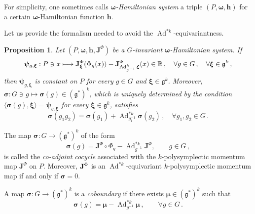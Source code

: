 \documentclass[11pt]{article}
\theoremstyle{plain}
\newtheorem{proposition}[theorem]{Proposition}
\theoremstyle{definition}
\newcommand{\bomega}{{\boldsymbol{\omega}}}
\newcommand{\bh}{{\boldsymbol{h}}}
\DeclareMathOperator{\Ad}{Ad}
\numberwithin{equation}{section}
\begin{document}
For simplicity, one sometimes calls {\it $\bomega$-Hamiltonian system} a triple $(P,\bomega,\bh)$ for a certain $\bomega$-Hamiltonian function $\bh$. 

Let us provide the formalism needed to avoid the $\Ad^{*k}$-equivariantness.

\begin{proposition}
\label{Prop::PsiConstant}
Let $(P,\boldsymbol\omega,\bm h,\mathbf{J}^\Phi)$ be a $G$-invariant $\bomega$-Hamiltonian system. If
\[
    \boldsymbol\psi _{g,\boldsymbol{\xi}}:P\ni x\longmapsto  {\bf J}^\Phi_{\boldsymbol{\xi}}(\Phi_g(x))-{\bf J}^\Phi_{\Ad_{g^{-1}}^k\boldsymbol{\xi}}(x)\in\mathbb{R}\,,\quad\forall g\in G\,,\quad\forall \boldsymbol{\xi}\in\mathfrak{g}^k\,,
\]
then $\boldsymbol\psi_{g,\boldsymbol{\xi}}$ is constant on $P$ for every $g\in G$ and $\boldsymbol{\xi}\in\mathfrak{g}^k$. Moreover, $\boldsymbol\sigma:G\ni g\mapsto {\boldsymbol \sigma}(g)\in (\mathfrak{g}^*)^k$, which is uniquely determined by the condition $\langle \boldsymbol\sigma(g),\boldsymbol{\xi}\rangle =\boldsymbol\psi_{g,\boldsymbol{\xi}}$ for every $
{\bm \xi}\in \mathfrak{g}^k$, satisfies
\[    \boldsymbol\sigma(g_1g_2)=\boldsymbol\sigma(g_1)+\Ad^{*k}_{g_1^{-1}}\boldsymbol\sigma(g_2)\,,\quad\forall g_1,g_2\in G\,.
\]
\end{proposition}


The map $\boldsymbol\sigma:G\rightarrow (\mathfrak{g}^*)^k$ of the form
\[
\boldsymbol\sigma(g)=\mathbf{J}^\Phi\circ \Phi_g-\Ad^{*k}_{g^{-1}}\mathbf{J}^\Phi,\qquad g\in G\,,
\]
is called the {\it co-adjoint cocycle} associated with the $k$-polysymplectic momentum map $\mathbf{J}^\Phi$ on $P$. Moreover, ${\bf J}^\Phi$ is an $\Ad^{*k}$-equivariant $k$-polysymplectic momentum map if and only if $\boldsymbol\sigma=0$. 

A map $\boldsymbol\sigma:G\rightarrow(\mathfrak{g}^*)^k$ is a {\it coboundary} if there exists $\boldsymbol\mu\in(\mathfrak{g}^*)^k$ such that
\[
\boldsymbol\sigma(g)=\boldsymbol\mu-\Ad_{g^{-1}}^{*k}\boldsymbol\mu\,,\qquad \forall g\in G\,.
\]
\end{document}

